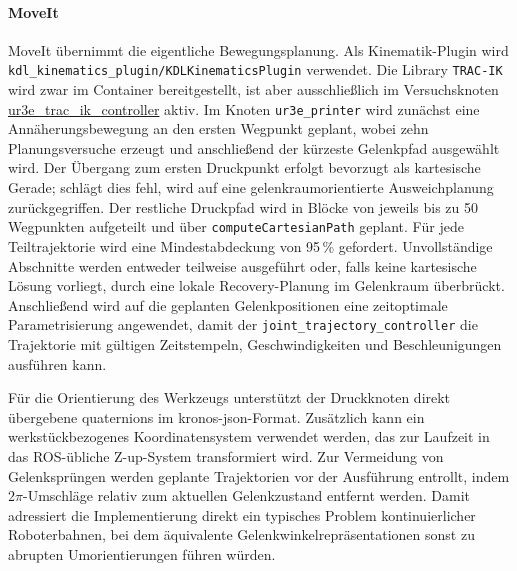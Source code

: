             \paragraph{MoveIt}
            MoveIt übernimmt die eigentliche Bewegungsplanung.
            Als Kinematik-Plugin wird \texttt{kdl\_kinematics\_plugin/KDLKinematicsPlugin} verwendet.
            Die Library \texttt{TRAC-IK} wird zwar im Container bereitgestellt, ist aber ausschließlich im Versuchsknoten \url{ur3e_trac_ik_controller} aktiv.
            Im Knoten \texttt{ur3e\_printer} wird zunächst eine Annäherungsbewegung an den ersten Wegpunkt geplant,
            wobei zehn Planungsversuche erzeugt und anschließend der kürzeste Gelenkpfad ausgewählt wird.
            Der Übergang zum ersten Druckpunkt erfolgt bevorzugt als kartesische Gerade;
            schlägt dies fehl, wird auf eine gelenkraumorientierte Ausweichplanung zurückgegriffen.
            Der restliche Druckpfad wird in Blöcke von jeweils bis zu 50 Wegpunkten aufgeteilt und über \texttt{computeCartesianPath} geplant.
            Für jede Teiltrajektorie wird eine Mindestabdeckung von 95\,\% gefordert.
            Unvollständige Abschnitte werden entweder teilweise ausgeführt oder,
            falls keine kartesische Lösung vorliegt,
            durch eine lokale Recovery-Planung im Gelenkraum überbrückt.
            Anschließend wird auf die geplanten Gelenkpositionen eine zeitoptimale Parametrisierung angewendet,
            damit der \texttt{joint\_trajectory\_controller} die Trajektorie mit gültigen Zeitstempeln,
            Geschwindigkeiten und Beschleunigungen ausführen kann.

            Für die Orientierung des Werkzeugs unterstützt der Druckknoten direkt übergebene \glspl{quaternion} im \ac{kronos}-\gls{json}-Format.
            Zusätzlich kann ein werkstückbezogenes Koordinatensystem verwendet werden,
            das zur Laufzeit in das ROS-übliche Z-up-System transformiert wird.
            Zur Vermeidung von Gelenksprüngen werden geplante Trajektorien vor der Ausführung entrollt,
            indem $2\pi$-Umschläge relativ zum aktuellen Gelenkzustand entfernt werden.
            Damit adressiert die Implementierung direkt ein typisches Problem kontinuierlicher Roboterbahnen,
            bei dem äquivalente Gelenkwinkelrepräsentationen sonst zu abrupten Umorientierungen führen würden.

